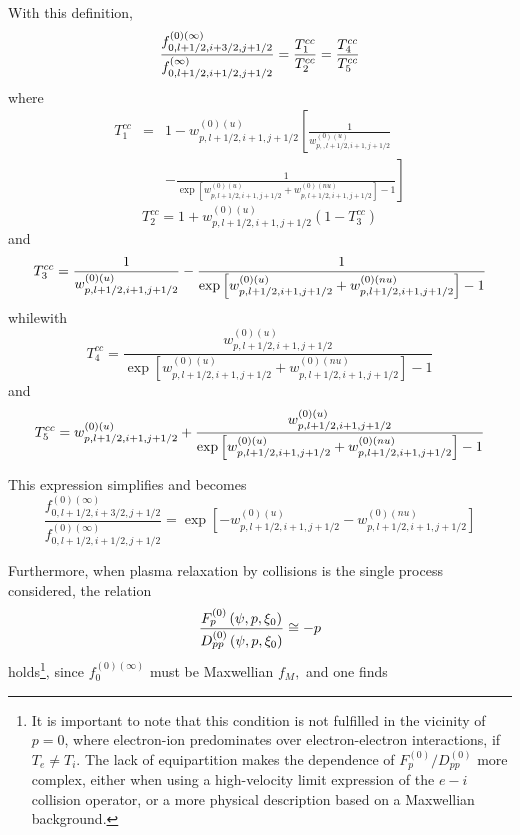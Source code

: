 
With this definition,
\begin{equation}
\frac{f_{0,l+1/2,i+3/2,j+1/2}^{\left( 0\right) (\infty )}}{%
f_{0,l+1/2,i+1/2,j+1/2}^{(\infty )}}=\frac{T_{1}^{cc}}{T_{2}^{cc}}=\frac{%
T_{4}^{cc}}{T_{5}^{cc}}
\end{equation}
where
\begin{eqnarray}
T_{1}^{cc} &=&1-w_{p,l+1/2,i+1,j+1/2}^{\left( 0\right) (u)}\left[ \frac{1}{
w_{p,,l+1/2,i+1,j+1/2}^{\left( 0\right) (u)}}\right.  \nonumber \\
&&\left. -\frac{1}{\exp \left[ w_{p,l+1/2,i+1,j+1/2}^{\left( 0\right)
(u)}+w_{p,l+1/2,i+1,j+1/2}^{\left( 0\right) (nu)}\right] -1}\right]
\end{eqnarray}
\begin{equation}
T_{2}^{cc}=1+w_{p,l+1/2,i+1,j+1/2}^{\left( 0\right) (u)}\left(
1-T_{3}^{cc}\right)
\end{equation}
and
\begin{equation}
T_{3}^{cc}=\frac{1}{w_{p,l+1/2,i+1,j+1/2}^{\left( 0\right) (u)}}-\frac{1}{%
\exp \left[ w_{p,l+1/2,i+1,j+1/2}^{\left( 0\right)
(u)}+w_{p,l+1/2,i+1,j+1/2}^{\left( 0\right) (nu)}\right] -1}
\end{equation}
whilewith
\begin{equation}
T_{4}^{cc}=\frac{w_{p,l+1/2,i+1,j+1/2}^{\left( 0\right) (u)}}{\exp \left[
w_{p,l+1/2,i+1,j+1/2}^{\left( 0\right) (u)}+w_{p,l+1/2,i+1,j+1/2}^{\left(
0\right) (nu)}\right] -1}
\end{equation}
and
\begin{equation}
T_{5}^{cc}=w_{p,l+1/2,i+1,j+1/2}^{\left( 0\right) (u)}+\frac{%
w_{p,l+1/2,i+1,j+1/2}^{\left( 0\right) (u)}}{\exp \left[
w_{p,l+1/2,i+1,j+1/2}^{\left( 0\right) (u)}+w_{p,l+1/2,i+1,j+1/2}^{\left(
0\right) (nu)}\right] -1}
\end{equation}

This expression simplifies and becomes
\begin{equation}
\frac{f_{0,l+1/2,i+3/2,j+1/2}^{\left( 0\right) (\infty )}}{
f_{0,l+1/2,i+1/2,j+1/2}^{\left( 0\right) (\infty )}}=\exp \left[
-w_{p,l+1/2,i+1,j+1/2}^{\left( 0\right) (u)}-w_{p,l+1/2,i+1,j+1/2}^{\left(
0\right) (nu)}\right]
\end{equation}

Furthermore, when plasma relaxation by collisions is the single process
considered, the relation
\begin{equation}
\frac{F_{p}^{\left( 0\right) }\left( \psi ,p,\xi _{0}\right) }{%
D_{pp}^{\left( 0\right) }\left( \psi ,p,\xi _{0}\right) }\cong -p
\end{equation}
holds\footnote{%
It is important to note that this condition is not fulfilled in the vicinity
of $p=0$, where electron-ion predominates over electron-electron
interactions, if $T_{e}\neq T_{i}.$ The lack of equipartition makes the
dependence of $F_{p}^{\left( 0\right) }/D_{pp}^{\left( 0\right) }$ more
complex, either when using a high-velocity limit expression of the $e-i$
collision operator, or a more physical description based on a Maxwellian
background.}, since $f_{0}^{\left( 0\right) (\infty )}$ must be Maxwellian $%
f_{M},$ and one finds

